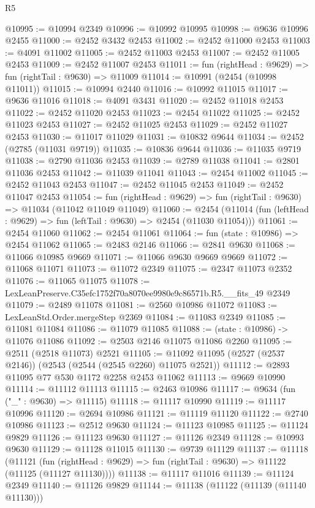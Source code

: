 \begin{lexlean}{R5}
\begin{coremodule}
@10995 := @10994 @2349
@10996 := @10992 @10995
@10998 := @9636 @10996 @2455
@11000 := @2452 @3432 @2453
@11002 := @2452 @11000 @2453
@11003 := @4091 @11002
@11005 := @2452 @11003 @2453
@11007 := @2452 @11005 @2453
@11009 := @2452 @11007 @2453
@11011 := fun (rightHead : @9629) => fun (rightTail : @9630) => @11009
@11014 := @10991 (@2454 (@10998 @11011))
@11015 := @10994 @2440
@11016 := @10992 @11015
@11017 := @9636 @11016
@11018 := @4091 @3431
@11020 := @2452 @11018 @2453
@11022 := @2452 @11020 @2453
@11023 := @2454 @11022
@11025 := @2452 @11023 @2453
@11027 := @2452 @11025 @2453
@11029 := @2452 @11027 @2453
@11030 := @11017 @11029
@11031 := @10832 @9644
@11034 := @2452 (@2785 (@11031 @9719))
@11035 := @10836 @9644
@11036 := @11035 @9719
@11038 := @2790 @11036 @2453
@11039 := @2789 @11038
@11041 := @2801 @11036 @2453
@11042 := @11039 @11041
@11043 := @2454 @11002
@11045 := @2452 @11043 @2453
@11047 := @2452 @11045 @2453
@11049 := @2452 @11047 @2453
@11054 := fun (rightHead : @9629) => fun (rightTail : @9630) => @11034 (@11042 @11049 @11049)
@11060 := @2454 (@11014 (fun (leftHead : @9629) => fun (leftTail : @9630) => @2454 (@11030 @11054)))
@11061 := @2454 @11060
@11062 := @2454 @11061
@11064 := fun (state : @10986) => @2454 @11062
@11065 := @2483 @2146
@11066 := @2841 @9630
@11068 := @11066 @10985 @9669
@11071 := @11066 @9630 @9669 @9669
@11072 := @11068 @11071
@11073 := @11072 @2349
@11075 := @2347 @11073 @2352
@11076 := @11065 @11075
@11078 := LexLeanPreserve.C35efc1752f70a8070ee9980e9c86571b.R5.__fits_49 @2349
@11079 := @2489 @11078
@11081 := @2560 @10986 @11072
@11083 := LexLeanStd.Order.mergeStep @2369
@11084 := @11083 @2349
@11085 := @11081 @11084
@11086 := @11079 @11085
@11088 := (state : @10986) -> @11076 @11086
@11092 := @2503 @2146 @11075 @11086 @2260
@11095 := @2511 (@2518 @11073) @2521
@11105 := @11092 @11095 (@2527 (@2537 @2146)) (@2543 (@2544 (@2545 @2260) @11075 @2521))
@11112 := @2893 @11095 @77 @530 @1172 @2258 @2453 @11062
@11113 := @9669 @10990
@11114 := @11112 @11113
@11115 := @2463 @10986
@11117 := @9634 (fun ("_" : @9630) => @11115)
@11118 := @11117 @10990
@11119 := @11117 @10996
@11120 := @2694 @10986
@11121 := @11119 @11120
@11122 := @2740 @10986
@11123 := @2512 @9630
@11124 := @11123 @10985
@11125 := @11124 @9829
@11126 := @11123 @9630
@11127 := @11126 @2349
@11128 := @10993 @9630
@11129 := @11128 @11015
@11130 := @9739 @11129
@11137 := @11118
    (@11121 (fun (rightHead : @9629) => fun (rightTail : @9630) => @11122 (@11125 (@11127 @11130))))
@11138 := @11117 @11016
@11139 := @11124 @2349
@11140 := @11126 @9829
@11144 := @11138 (@11122 (@11139 (@11140 @11130)))

\end{coremodule}
\end{lexlean}
